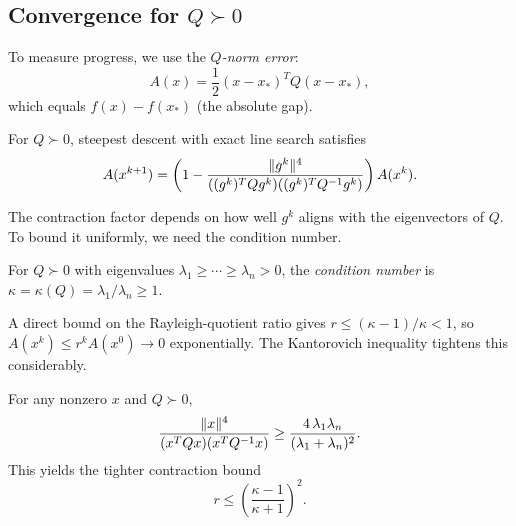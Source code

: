 \subsection{Convergence for \texorpdfstring{$Q \succ 0$}{Q ≻ 0}}\label{sec:convergence-sd}

To measure progress, we use the \emph{$Q$-norm error}:
\begin{equation}\label{eq:q-norm-error}
	A(x) = \frac{1}{2}(x - x_*)^T Q (x - x_*),
\end{equation}
which equals $f(x) - f(x_*)$ (the absolute gap).

\begin{theorem}\label{thm:grad-conv}
	For $Q \succ 0$, steepest descent with exact line search satisfies
	\begin{equation}\label{eq:sd-contraction}
		A(x^{k+1}) = \left(1 - \frac{\lVert g^k\rVert^4}{((g^k)^T Q g^k)((g^k)^T Q^{-1} g^k)}\right) A(x^k).
	\end{equation}
\end{theorem}

The contraction factor depends on how well $g^k$ aligns with the eigenvectors of $Q$.
To bound it uniformly, we need the condition number.

\begin{definition}\label{def:kappa}
	For $Q \succ 0$ with eigenvalues $\lambda_1 \geq \cdots \geq \lambda_n > 0$, the \textit{condition number} is
	$\kappa = \kappa(Q) = \lambda_1 / \lambda_n \geq 1$.
\end{definition}

A direct bound on the Rayleigh-quotient ratio gives $r \leq (\kappa - 1)/\kappa < 1$, so $A(x^k) \leq r^k A(x^0) \to 0$ exponentially.
The Kantorovich inequality tightens this considerably.

\begin{theorem}\label{thm:kantorovich}
	For any nonzero $x$ and $Q \succ 0$,
	\begin{equation}\label{eq:kantorovich}
		\frac{\lVert x\rVert^4}{(x^T Q x)(x^T Q^{-1} x)} \geq \frac{4\, \lambda_1 \lambda_n}{(\lambda_1 + \lambda_n)^2}.
	\end{equation}
	This yields the tighter contraction bound
	\begin{equation}\label{eq:sd-rate-kantorovich}
		r \leq \left(\frac{\kappa - 1}{\kappa + 1}\right)^{\!2}.
	\end{equation}
\end{theorem}

